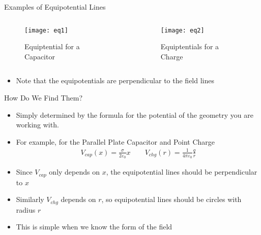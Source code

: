 \documentclass{beamer}
\begin{document}
\begin{frame}{Examples of Equipotential Lines}
  \begin{columns}
    \begin{column}{0.5\textwidth}
      \begin{figure}[H]
        \centering
        \texttt{[image: eq1]}
        \caption{Equiptential for a Capacitor}
      \end{figure}
    \end{column}
    \begin{column}{0.5\textwidth}
      \begin{figure}[H]
        \centering
        \texttt{[image: eq2]}
        \caption{Equiptentials for a Charge}
      \end{figure}
    \end{column}
  \end{columns}
  \begin{itemize}
  \item Note that the equipotentials are perpendicular to the field lines
  \end{itemize}
\end{frame}
\begin{frame}{How Do We Find Them?}
  \begin{itemize}
  \item Simply determined by the formula for the potential of the geometry you are working with. 
  \item For example, for the Parallel Plate Capacitor and Point Charge
    \begin{align*}
      V_{cap}(x)=\frac{\sigma}{2\varepsilon_0}x\qquad
      V_{chg}(r)=\frac{1}{4\pi\varepsilon_0}\frac{q}{r}
    \end{align*}
  \item Since $V_{cap}$ only depends on $x$, the equipotential lines should be perpendicular to $x$
  \item Similarly $V_{chg}$ depends on $r$, so equipotential lines should be circles with radius $r$
  \item This is simple when we know the form of the field
  \end{itemize}
\end{frame}
\end{document}

